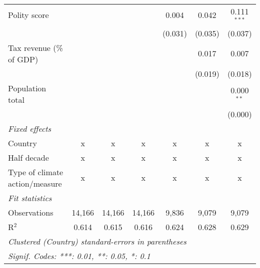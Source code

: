 \begin{tabular}{lcccccc}
   Polity score                                                    &         &                &                & 0.004          & 0.042          & 0.111$^{***}$\\   
                                                                   &         &                &                & (0.031)        & (0.035)        & (0.037)\\   
   Tax revenue (\% of GDP)                                         &         &                &                &                & 0.017          & 0.007\\   
                                                                   &         &                &                &                & (0.019)        & (0.018)\\   
   Population total                                                &         &                &                &                &                & 0.000$^{**}$\\   
                                                                   &         &                &                &                &                & (0.000)\\   
   \emph{Fixed effects}\\
   Country                                                         & x       & x              & x              & x              & x              & x\\  
   Half decade                                                     & x       & x              & x              & x              & x              & x\\  
   Type of climate action/measure                                  & x       & x              & x              & x              & x              & x\\  
   \midrule \emph{Fit statistics}\\
   Observations                                                    & 14,166  & 14,166         & 14,166         & 9,836          & 9,079          & 9,079\\  
   R$^2$                                                           & 0.614   & 0.615          & 0.616          & 0.624          & 0.628          & 0.629\\  
   \midrule
   \multicolumn{7}{l}{\emph{Clustered (Country) standard-errors in parentheses}}\\
   \multicolumn{7}{l}{\emph{Signif. Codes: ***: 0.01, **: 0.05, *: 0.1}}\\
\end{tabular}
\par\endgroup


